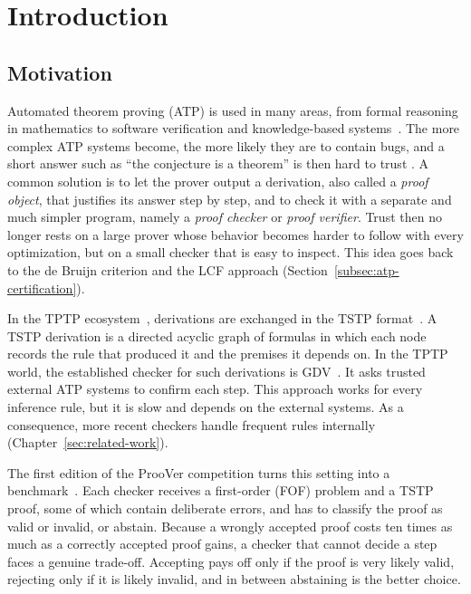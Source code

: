 \section{Introduction}
\label{sec:introduction}

\subsection{Motivation}
\label{subsec:motivation}

Automated theorem proving (ATP) is used in many areas, from formal reasoning in mathematics to software verification and knowledge-based systems~\citep{HandbookAR2001}.
The more complex ATP systems become, the more likely they are to contain bugs, and a short answer such as ``the conjecture is a theorem'' is then hard to trust \citep{taprogge2026formal}.
A common solution is to let the prover output a derivation, also called a \emph{proof object}, that justifies its answer step by step, and to check it with a separate and much simpler program, namely a \emph{proof checker} or \emph{proof verifier}.
Trust then no longer rests on a large prover whose behavior becomes harder to follow with every optimization, but on a small checker that is easy to inspect. This idea goes back to the de Bruijn criterion and the LCF approach (Section~\ref{subsec:atp-certification}).

In the TPTP ecosystem~\citep{Sut24}, derivations are exchanged in the TSTP format~\citep{Sut10, Sut07-CSR}.
A TSTP derivation is a directed acyclic graph of formulas in which each node records the rule that produced it and the premises it depends on.
In the TPTP world, the established checker for such derivations is GDV~\citep{Sutcliffe2006GDV,GDVSeminar}. It asks trusted external ATP systems to confirm each step.
This approach works for every inference rule, but it is slow and depends on the external systems.
As a consequence, more recent checkers handle frequent rules internally (Chapter~\ref{sec:related-work}).

The first edition of the ProoVer competition turns this setting into a benchmark~\citep{proover-competition}.
Each checker receives a first-order (FOF) problem and a TSTP proof, some of which contain deliberate errors, and has to classify the proof as valid or invalid, or abstain.
Because a wrongly accepted proof costs ten times as much as a correctly accepted proof gains, a checker that cannot decide a step faces a genuine trade-off. Accepting pays off only if the proof is very likely valid, rejecting only if it is likely invalid, and in between abstaining is the better choice.

